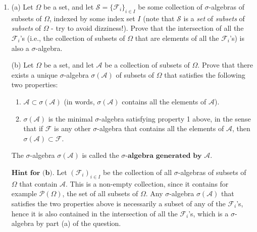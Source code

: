 \documentclass[11pt]{report}
\providecommand{\cal}{\mathcal}
\theoremstyle{plain}
\theoremstyle{definition}
\begin{document}
\begin{enumerate}[label=\arabic*.]
The prisoners cannot coordinate their actions, but
they are all rational, know calculus and probability
theory, and each is equipped with a random number
generator. Find the strategy that the prisoners will
take to maximize their chance of survival, and compute
what that chance is, as a function of $N$ and in the
limit when $N$ is very large. For extra fun, try to
guess in advance how big or small you expect the
survival likelihood to be, and see how your guess
measures up to the actual result.

\item (a) Let $\Omega$ be a set, and let
${\cal S} = \{{\cal F}_i\}_{i\in I}$ be some
collection of $\sigma$-algebras of subsets of
$\Omega$, indexed by some index set $I$ (note that
${\cal S}$ is a \emph{set} of \emph{subsets} of \emph{subsets} of
$\Omega$ - try to avoid dizziness!). Prove that the
intersection of all the ${\cal F}_i$'s (i.e., the
collection of subsets of $\Omega$ that are elements
of all the ${\cal F}_i$'s) is also a $\sigma$-algebra.

(b) Let $\Omega$ be a set, and let ${\cal A}$ be a
collection of subsets of $\Omega$. Prove that there
exists a unique $\sigma$-algebra $\sigma({\cal A})$
of subsets of $\Omega$ that satisfies the following
two properties:

\begin{enumerate}[label=(\roman*)]
\item ${\cal A} \subset \sigma({\cal A})$ (in words,
$\sigma({\cal A})$ contains all the elements of
${\cal A}$).

\item $\sigma({\cal A})$ is the minimal $\sigma$-algebra
satisfying property 1 above, in the sense that if
${\cal F}$ is any other $\sigma$-algebra that
contains all the elements of ${\cal A}$, then
$\sigma({\cal A}) \subset {\cal F}$.
\end{enumerate}

\noindent The $\sigma$-algebra $\sigma({\cal A})$ is called the
$\textbf{$\sigma$-algebra generated by } {\cal A}$.

$\textbf{Hint for (b).}$ Let $({\cal F}_i)_{i\in I}$
be the collection of all $\sigma$-algebras of subsets
of $\Omega$ that contain ${\cal A}$. This is a
non-empty collection, since it contains for example
${\cal P}(\Omega)$, the set of all subsets of
$\Omega$. Any $\sigma$-algebra $\sigma({\cal A})$
that satisfies the two properties above is necessarily
a subset of any of the ${\cal F}_i$'s, hence it is
also contained in the intersection of all the
${\cal F}_i$'s, which is a $\sigma$-algebra by part
(a) of the question.


\end{enumerate}
\end{document}
